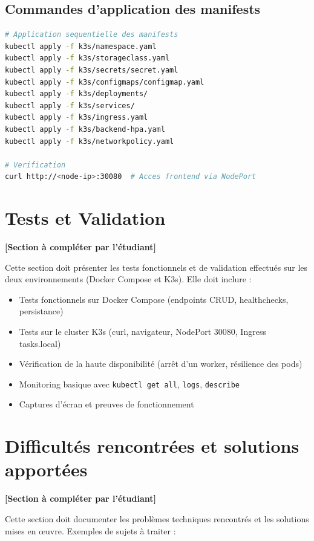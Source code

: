 \documentclass[12pt,a4paper]{report}
\begin{document}
\section{Commandes d'application des manifests}

\begin{lstlisting}[language=bash]
# Application sequentielle des manifests
kubectl apply -f k3s/namespace.yaml
kubectl apply -f k3s/storageclass.yaml
kubectl apply -f k3s/secrets/secret.yaml
kubectl apply -f k3s/configmaps/configmap.yaml
kubectl apply -f k3s/deployments/
kubectl apply -f k3s/services/
kubectl apply -f k3s/ingress.yaml
kubectl apply -f k3s/backend-hpa.yaml
kubectl apply -f k3s/networkpolicy.yaml

# Verification
curl http://<node-ip>:30080  # Acces frontend via NodePort
\end{lstlisting}

\chapter{Tests et Validation}
\textbf{[Section à compléter par l'étudiant]}

Cette section doit présenter les tests fonctionnels et de validation effectués sur les deux environnements (Docker Compose et K3s). Elle doit inclure :

\begin{itemize}
\item Tests fonctionnels sur Docker Compose (endpoints CRUD, healthchecks, persistance)
\item Tests sur le cluster K3s (curl, navigateur, NodePort 30080, Ingress tasks.local)
\item Vérification de la haute disponibilité (arrêt d'un worker, résilience des pods)
\item Monitoring basique avec \texttt{kubectl get all}, \texttt{logs}, \texttt{describe}
\item Captures d'écran et preuves de fonctionnement
\end{itemize}

\chapter{Difficultés rencontrées et solutions apportées}
\textbf{[Section à compléter par l'étudiant]}

Cette section doit documenter les problèmes techniques rencontrés et les solutions mises en œuvre. Exemples de sujets à traiter :
\end{document}
